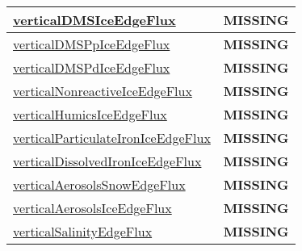 {\begin{center}
\begin{longtable}{| p{2.0in} | p{4.0in} |}
    \hline
    \hyperref[subsec:var_sec_tracer_edge_fluxes_verticalDMSIceEdgeFlux]{verticalDMSIceEdgeFlux} & {\bf \color{red} MISSING} \\
    \hline
    \hyperref[subsec:var_sec_tracer_edge_fluxes_verticalDMSPpIceEdgeFlux]{verticalDMSPpIceEdgeFlux} & {\bf \color{red} MISSING} \\
    \hline
    \hyperref[subsec:var_sec_tracer_edge_fluxes_verticalDMSPdIceEdgeFlux]{verticalDMSPdIceEdgeFlux} & {\bf \color{red} MISSING} \\
    \hline
    \hyperref[subsec:var_sec_tracer_edge_fluxes_verticalNonreactiveIceEdgeFlux]{verticalNonreactiveIceEdgeFlux} & {\bf \color{red} MISSING} \\
    \hline
    \hyperref[subsec:var_sec_tracer_edge_fluxes_verticalHumicsIceEdgeFlux]{verticalHumicsIceEdgeFlux} & {\bf \color{red} MISSING} \\
    \hline
    \hyperref[subsec:var_sec_tracer_edge_fluxes_verticalParticulateIronIceEdgeFlux]{verticalParticulateIronIceEdge\-Flux} & {\bf \color{red} MISSING} \\
    \hline
    \hyperref[subsec:var_sec_tracer_edge_fluxes_verticalDissolvedIronIceEdgeFlux]{verticalDissolvedIronIceEdgeFlux} & {\bf \color{red} MISSING} \\
    \hline
    \hyperref[subsec:var_sec_tracer_edge_fluxes_verticalAerosolsSnowEdgeFlux]{verticalAerosolsSnowEdgeFlux} & {\bf \color{red} MISSING} \\
    \hline
    \hyperref[subsec:var_sec_tracer_edge_fluxes_verticalAerosolsIceEdgeFlux]{verticalAerosolsIceEdgeFlux} & {\bf \color{red} MISSING} \\
    \hline
    \hyperref[subsec:var_sec_tracer_edge_fluxes_verticalSalinityEdgeFlux]{verticalSalinityEdgeFlux} & {\bf \color{red} MISSING} \\
    \hline
\end{longtable}
\end{center}
}
